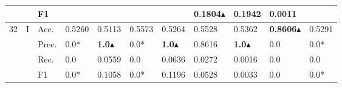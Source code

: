 \begin{tabular}{cclllllllll}
                                                                                           &                                   & F1                                                   &                         &                         &                              &                         & \textbf{0.1804}$\blacktriangle$                                                             & 0.1942                                                                      & 0.0011                                    &                                           \\ 
    \midrule
    \multirow{12}{*}{32}                                                                   & \multirow{4}{*}{I}                & Acc.                                                 & 0.5260                  & 0.5113                  & 0.5573                       & 0.5264                  & 0.5528                                                                       & 0.5362                                                                      & \textbf{0.8606}$\blacktriangle$                          & 0.5291                                    \\
                                                                                           &                                   & Prec.                                                & 0.0*                    & \textbf{1.0}$\blacktriangle$           & 0.0*                         & \textbf{1.0}$\blacktriangle$           & 0.8616                                                                       & \textbf{1.0}$\blacktriangle$                                                               & 0.0                                       & 0.0*                                      \\
                                                                                           &                                   & Rec.                                                 & 0.0                     & 0.0559                  & 0.0                          & 0.0636                  & 0.0272                                                                       & 0.0016                                                                      & 0.0                                       & 0.0                                       \\
                                                                                           &                                   & F1                                                   & 0.0*                    & 0.1058                  & 0.0*                         & 0.1196                  & 0.0528                                                                       & 0.0033                                                                      & 0.0                                       & 0.0*                                      \\ 

\end{tabular}
